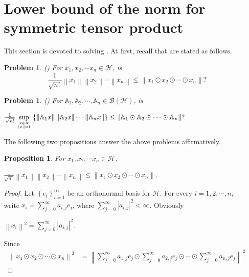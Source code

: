\documentclass[11pt]{article}
\theoremstyle{plain}
\newtheorem{prop}[thm]{Proposition}
\newtheorem{prob}[thm]{Problem}
\theoremstyle{definition}
\begin{document}
{\section{Lower bound of the norm for symmetric tensor product}

This section is devoted to  solving \cite[Problem 1 and Problem 2]{GA}. At first, recall that \cite[Problem 1 and Problem 2]{GA} are stated  as follows.
\begin{prob}(\cite[Problem 1]{GA})
For $x_{1},x_{2},\cdots x_{n} \in \mathcal{H}$, 	is		$$\frac{1}{\sqrt{n!} } \left \| x_{1}    \right \| \left \| x_{2}     \right \|\cdots \left \| x_{n}     \right \| \le \left \| x_{1}\odot x_{2}\odot \cdots \odot x_{n}  \right \|? $$
	
\end{prob}
\begin{prob}(\cite[Problem 2]{GA})
	For $\mathbb{A}_{1},\mathbb{A}_{2},\cdots,\mathbb{A}_{n} \in \mathcal{ B(H)}$, is
	\begin{center}
		$\frac{1}{\sqrt{n!} } \sup\limits_{x\in H \atop \left \| x \right \| =1} \left \{ \left \| \mathbb{A}_{1}x \right \| \left \| \mathbb{A}_{2}x \right \| \cdots \left \| \mathbb{A}_{n}x \right \|  \right \} \le\left \| \mathbb{A}_{1}\odot \mathbb{A}_{2}\odot \cdots \odot \mathbb{A}_{n}    \right \|  ?$
	\end{center}
\end{prob}
The following two propositions answer the above problems affirmatively.
\begin{prop}\label{prop3.1}
	For $x_{1},x_{2},\cdots x_{n} \in \mathcal{H} $,
	\begin{center}
		$\frac{1}{\sqrt{n!} } \left \| x_{1}    \right \| \left \| x_{2}     \right \|\cdots \left \| x_{n}     \right \| \le \left \| x_{1}\odot x_{2}\odot \cdots \odot x_{n}  \right \| $.
	\end{center}
\end{prop}
\begin{proof}
	Let $\left \{ e_{i} \right \} _{i=1}^{\infty } $ be an orthonormal basis for $\mathcal{H}$. For every $i=1,2,\cdots,n$, write $x_{i}=\sum\limits_{j=0}^{\infty } a_{i,j} e_{j} $, where $\sum\limits_{j=0}^{\infty } \left | a_{i,j} \right | ^{2} <\infty $. Obviously
	\begin{center}
		$\left \| x_{i}  \right \| ^{2} =\sum\limits_{j=0}^{\infty } \left | a_{i,j} \right | ^{2} $.	
	\end{center}
	Since
	$$  \begin{aligned}
		\left \| x_{1}\odot x_{2}\odot \cdots \odot x_{n}  \right \|^{2}  & = \left \| \sum\limits_{j=0}^{\infty } a_{1,j}e_{j} \odot \sum\limits_{j=0}^{\infty } a_{2,j}e_{j} \odot \cdots \odot \sum\limits_{j=0}^{\infty } a_{n,j}e_{j}  \right \| ^{2}

\end{aligned}$$
\end{proof}}
\end{document}
